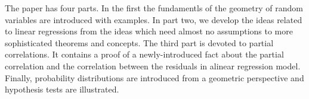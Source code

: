 \begin{fullwidth}
The paper has four parts. In the first the fundamentls of the geometry
of random variables are introduced with examples.
In part two, we develop the ideas related to linear regressions
from the ideas which need almost no assumptions to more sophisticated theorems
and concepts.
The third part is devoted to partial correlations. It contains a proof of
a newly-introduced fact about the partial correlation and the correlation
between the residuals in  alinear regression model.
Finally, probability distributions are introduced from a geometric perspective
and hypothesis tests are illustrated.

\end{fullwidth}
